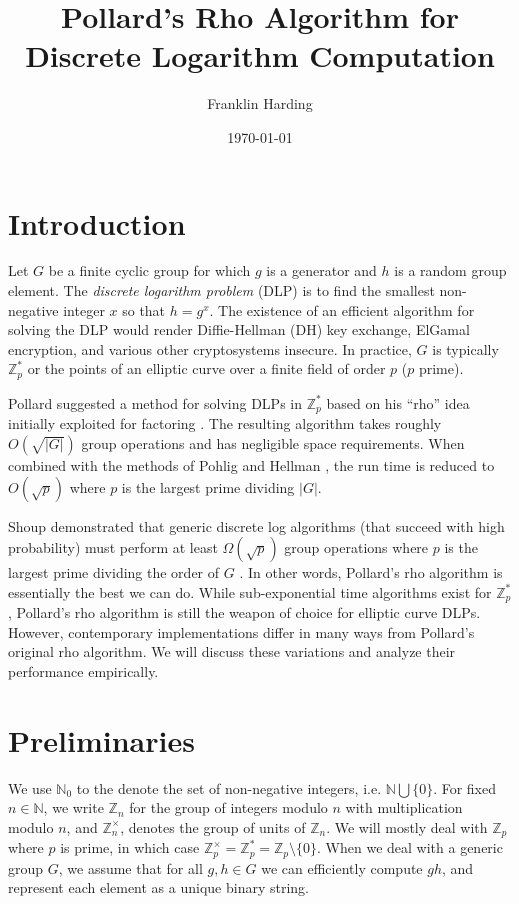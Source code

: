 \documentclass{article}
\title{Pollard's Rho Algorithm for Discrete Logarithm Computation}
\author{Franklin Harding}
\date{\today}
\newcommand{\ZZ}{\mathbb{Z}}
\newcommand{\NN}{\mathbb{N}}
\begin{document}
\maketitle

\section{Introduction}

Let $G$ be a finite cyclic group for which $g$ is a generator and $h$ is a random group element. The \textit{discrete logarithm problem} (DLP) is to find the smallest non-negative integer $x$ so that $h = g^x$. The existence of an efficient algorithm for solving the DLP would render Diffie-Hellman (DH) key exchange, ElGamal encryption, and various other cryptosystems insecure. In practice, $G$ is typically $\ZZ_p^*$ or the points of an elliptic curve over a finite field of order $p$ ($p$ prime).

Pollard suggested a method for solving DLPs in $\ZZ_p^*$ \cite{Pollard1978} based on his ``rho'' idea initially exploited for factoring \cite{Pollard1975}. The resulting algorithm takes roughly $O(\sqrt{|G|})$ group operations and has negligible space requirements. When combined with the methods of Pohlig and Hellman \cite{Pohlig78}, the run time is reduced to $O(\sqrt{p})$ where $p$ is the largest prime dividing $|G|$.

Shoup demonstrated that generic discrete log algorithms (that succeed with high probability) must perform at least $\Omega(\sqrt{p})$ group operations where $p$ is the largest prime dividing the order of $G$ \cite{Shoup1997}. In other words, Pollard's rho algorithm is essentially the best we can do. While sub-exponential time algorithms exist for $\ZZ_p^*$, Pollard's rho algorithm is still the weapon of choice for elliptic curve DLPs. However, contemporary implementations differ in many ways from Pollard's original rho algorithm. We will discuss these variations and analyze their performance empirically.

\section{Preliminaries}

We use $\NN_0$ to the denote the set of non-negative integers, i.e. $\NN \bigcup \{0\}$. For fixed $n \in \NN$, we write $\ZZ_n$ for the group of integers modulo $n$ with multiplication modulo $n$, and $\ZZ_n^{\times}$, denotes the group of units of $\ZZ_n$. We will mostly deal with $\ZZ_p$ where $p$ is prime, in which case $\ZZ_p^{\times}=\ZZ_p^*=\ZZ_p \setminus \{0\}$. When we deal with a generic group $G$, we assume that for all $g,h \in G$ we can efficiently compute $gh$, and represent each element as a unique binary string.
\end{document}
